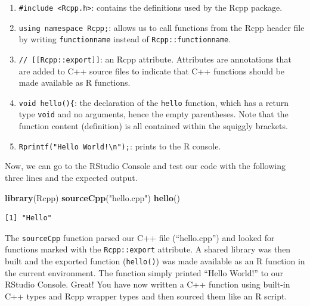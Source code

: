 \documentclass[
]{krantz}
\makeatletter
\newenvironment{Shaded}{\begin{snugshade}}{\end{snugshade}}
\newcommand{\KeywordTok}[1]{\textcolor[rgb]{0.27,0.27,0.27}{\textbf{#1}}}
\newcommand{\NormalTok}[1]{#1}
\newcommand{\StringTok}[1]{\textcolor[rgb]{0.5,0.5,0.5}{#1}}
\providecommand{\tightlist}{%
  \setlength{\itemsep}{0pt}\setlength{\parskip}{0pt}}
\newenvironment{kframe}{%
\medskip{}
\setlength{\fboxsep}{.8em}
 \def\at@end@of@kframe{}%
 \ifinner\ifhmode%
  \def\at@end@of@kframe{\end{minipage}}%
  \begin{minipage}{\columnwidth}%
 \fi\fi%
 \def\FrameCommand##1{\hskip\@totalleftmargin \hskip-\fboxsep
 \colorbox{shadecolor}{##1}\hskip-\fboxsep
     \hskip-\linewidth \hskip-\@totalleftmargin \hskip\columnwidth}%
 \MakeFramed {\advance\hsize-\width
   \@totalleftmargin\z@ \linewidth\hsize
   \@setminipage}}%
 {\par\unskip\endMakeFramed%
 \at@end@of@kframe}
\renewenvironment{Shaded}{\begin{kframe}}{\end{kframe}}
\makeatother
\begin{document}
\begin{enumerate}
\def\labelenumi{\arabic{enumi}.}
\tightlist
\item
  \texttt{\#include\ \textless{}Rcpp.h\textgreater{}}: contains the definitions used by the Rcpp package.

  \item

  \texttt{using\ namespace\ Rcpp;}: allows us to call functions from the Rcpp header file by writing \texttt{functionname} instead of \texttt{Rcpp::functionname}.

  \item

  \texttt{//\ {[}{[}Rcpp::export{]}{]}}: an Rcpp attribute. Attributes are annotations that are added to C++ source files to indicate that C++ functions should be made available as R functions.

  \item

  \texttt{void\ hello()\{}: the declaration of the \texttt{hello} function, which has a return type \texttt{void} and no arguments, hence the empty parentheses. Note that the function content (definition) is all contained within the squiggly brackets.

  \item

  \texttt{Rprintf("Hello\ World!\textbackslash{}n");}: prints to the R console.
\end{enumerate}

Now, we can go to the RStudio Console and test our code with the following three lines and the expected output.

\begin{Shaded}
\begin{Highlighting}[]
\KeywordTok{library}\NormalTok{(Rcpp)}
\KeywordTok{sourceCpp}\NormalTok{(}\StringTok{"hello.cpp"}\NormalTok{)}
\KeywordTok{hello}\NormalTok{()}
\end{Highlighting}
\end{Shaded}

\begin{verbatim}
[1] "Hello"
\end{verbatim}

The \texttt{sourceCpp} function parsed our C++ file (``hello.cpp'') and looked for functions marked with the \texttt{Rcpp::export} attribute. A shared library was then built and the exported function (\texttt{hello()}) was made available as an R function in the current environment. The function simply printed ``Hello World!'' to our RStudio Console. Great! You have now written a C++ function using built-in C++ types and Rcpp wrapper types and then sourced them like an R script.
\end{document}
